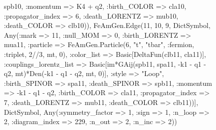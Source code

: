\documentclass{revtex4}
\begin{document}
\begin{figure}[!htb]
\begin{center}
{spb10, :momentum => K4 + q2, :birth_COLOR => cla10, :propagator_index => 6, :death_LORENTZ => mub10, :death_COLOR => clb10)), FeAmGen.Edge(11, 10, 9, Dict{Symbol, Any}(:mark => 11, :null_MOM => 0, :birth_LORENTZ => mua11, :particle => FeAmGen.Particle(6, "t", "tbar", :fermion, :triplet, 2//3, mt, 0), :color_list => Basic[DeltaFun(clb11, cla11)], :couplings_lorentz_list => Basic[im*GAij(spb11, spa11, -k1 - q1 - q2, mt)*Den(-k1 - q1 - q2, mt, 0)], :style => "Loop", :birth_SPINOR => spa11, :death_SPINOR => spb11, :momentum => -k1 - q1 - q2, :birth_COLOR => cla11, :propagator_index => 7, :death_LORENTZ => mub11, :death_COLOR => clb11))], Dict{Symbol, Any}(:symmetry_factor => 1, :sign => 1, :n_loop => 2, :diagram_index => 229, :n_out => 2, :n_inc => 2)) 
}
\end{center}
\end{figure}
\end{document}
